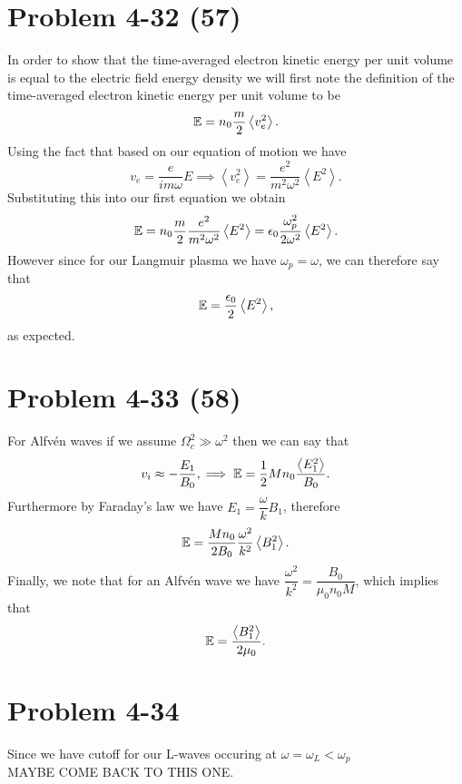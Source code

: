 \section*{Problem 4-32 (57)}
\label{sec:4-32}
In order to show that the time-averaged electron kinetic energy per unit volume is equal to the electric field energy density we will first note the definition of the time-averaged electron kinetic energy per unit volume to be
\begin{equation*}
	\mathbb{E} = n_0\frac{m}{2}\left<v_e^2 \right>.
\end{equation*}
Using the fact that based on our equation of motion we have
\begin{equation*}
	v_e = \dfrac{e}{im\omega}E \implies \left<v_e^2\right> = \dfrac{e^2}{m^2\omega^2}\left<E^2\right>.
\end{equation*}
Substituting this into our first equation we obtain
\begin{equation*}
	\mathbb{E} = n_0\frac{m}{2} \dfrac{e^2}{m^2\omega^2}\left<E^2\right> = \epsilon_0\dfrac{\omega^2_p}{2\omega^2}\left<E^2\right>.
\end{equation*}
However since for our Langmuir plasma we have \(\omega_p = \omega \), we can therefore say that 
\begin{equation*}
	\mathbb{E} = \dfrac{\epsilon_0}{2}\left<E^2\right>,
\end{equation*}
as expected.


\section*{Problem 4-33 (58)}
\label{sec:4-33}
For Alfv\'en waves if we assume \(\Omega^2_c \gg \omega^2 \) then we can say that 
\begin{equation*}
	v_i \approx -\dfrac{E_1}{B_0}, \implies \mathbb{E} = \dfrac{1}{2}Mn_0\dfrac{\left<E_1^2\right>}{B_0}.
\end{equation*}
Furthermore by Faraday's law we have \(E_1 = \dfrac{\omega}{k}B_1 \), therefore
\begin{equation*}
	\mathbb{E} = \dfrac{Mn_0}{2B_0}\dfrac{\omega^2}{k^2}\left<B^2_1 \right>.
\end{equation*}
Finally, we note that for an Alfv\'en wave we have \(\dfrac{\omega^2}{k^2} = \dfrac{B_0}{\mu_0n_0M} \), which implies that
\begin{equation*}
	\mathbb{E} = \dfrac{\left<B_1^2\right>}{2\mu_0}.
\end{equation*}

\section*{Problem 4-34}
\label{sec:4-34}
Since we have cutoff for our L-waves occuring at \(\omega = \omega_L < \omega_p \) \\
MAYBE COME BACK TO THIS ONE.

